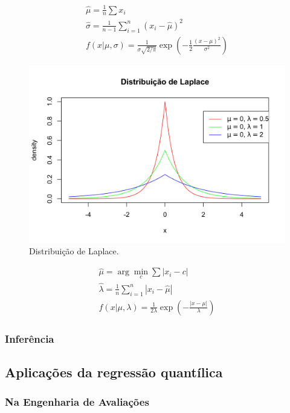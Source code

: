 \documentclass[a4paper, 12pt]{article}
\begin{document}
\[
\begin{aligned}
\hat \mu = \frac{1}{n}\sum x_i \\
\hat \sigma = \frac{1}{n-1} \sum_{i=1}^n (x_i - \hat \mu)^2\\
f(x|\mu, \sigma) = \frac{1}{\sigma\sqrt{2/\pi}}\exp \left (-\frac{1}{2}\frac{(x - \mu)^2}{\sigma^2} \right )
\end{aligned}
\]

\begin{figure}[H]

{\centering \includegraphics[width=0.7\linewidth]{images/dist_Laplace-1} 

}

\caption{Distribuição de Laplace.}\label{fig:dist_Laplace}
\end{figure}

\[
\begin{aligned}
\hat \mu = \arg\min_c \sum |x_i - c| \\
\hat \lambda = \frac{1}{n} \sum_{i=1}^n |x_i - \hat \mu| \\
f(x|\mu, \lambda) = \frac{1}{2 \lambda} \exp \left ( -\frac{|x - \mu|}{\lambda}\right )
\end{aligned}
\] \onecolumn

\hypertarget{inferencia}{%
\subsubsection{Inferência}\label{inferencia}}

\hypertarget{aplicacoes-da-regressao-quantilica}{%
\subsection{Aplicações da regressão
quantílica}\label{aplicacoes-da-regressao-quantilica}}

\hypertarget{na-engenharia-de-avaliacoes}{%
\subsubsection{Na Engenharia de
Avaliações}\label{na-engenharia-de-avaliacoes}}
\end{document}
